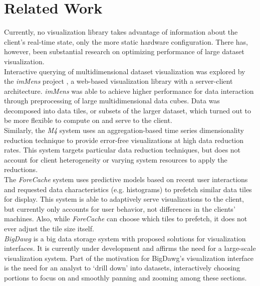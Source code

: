\section{Related Work}\label{visgoth-ch:related-work}

Currently, no visualization library takes advantage of information about the
client's real-time state, only the more static hardware configuration. There
has, however, been substantial research on optimizing performance of large
dataset visualization. \\

Interactive querying of multidimensional dataset visualization was explored by
the \emph{imMens} project \cite{immens}, a web-based visualization library with
a server-client architecture. \emph{imMens} was able to achieve higher
performance for data interaction through preprocessing of large
multidimensional data cubes. Data was decomposed into data tiles, or subsets of
the larger dataset, which turned out to be more flexible to compute on and
serve to the client. \\

Similarly, the \emph{M4} system \cite{m4} uses an aggregation-based time series
dimensionality reduction technique to provide error-free visualizations at high
data reduction rates. This system targets particular data reduction techniques,
but does not account for client heterogeneity or varying system resources to
apply the reductions. \\

The \emph{ForeCache} system \cite{forecache} uses predictive models based on
recent user interactions and requested data characteristics (e.g. histograms)
to prefetch similar data tiles for display. This system is able to adaptively
serve visualizations to the client, but currently only accounts for user
behavior, not differences in the clients' machines. Also, while
\emph{ForeCache} can choose which tiles to prefetch, it does not ever adjust
the tile size itself.\\

\emph{BigDawg} \cite{bigdawg} is a big data storage system with proposed solutions
for visualization interfaces. It is currently under development and affirms the
need for a large-scale visualization system. Part of the motivation for
BigDawg's visualization interface is the need for an analyst to `drill down'
into datasets, interactively choosing portions to focus on and smoothly panning
and zooming among these sections. \\


